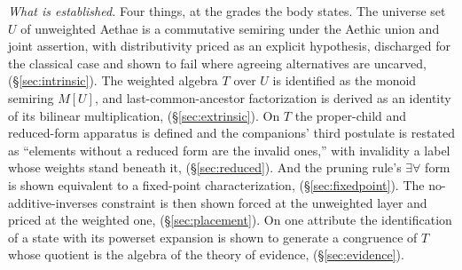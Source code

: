 \emph{What is established.} Four things, at the grades the body states. The universe set $U$ of unweighted Aethae is a commutative semiring under the Aethic union and joint assertion, with distributivity priced as an explicit hypothesis, discharged for the classical case and shown to fail where agreeing alternatives are uncarved, (\S\ref{sec:intrinsic}). The weighted algebra $T$ over $U$ is identified as the monoid semiring $M[U]$, and last-common-ancestor factorization is derived as an identity of its bilinear multiplication, (\S\ref{sec:extrinsic}). On $T$ the proper-child and reduced-form apparatus is defined and the companions' third postulate is restated as ``elements without a reduced form are the invalid ones,'' with invalidity a label whose weights stand beneath it, (\S\ref{sec:reduced}). And the pruning rule's $\exists\forall$ form is shown equivalent to a fixed-point characterization, (\S\ref{sec:fixedpoint}). The no-additive-inverses constraint is then shown forced at the unweighted layer and priced at the weighted one, (\S\ref{sec:placement}). On one attribute the identification of a state with its powerset expansion is shown to generate a congruence of $T$ whose quotient is the algebra of the theory of evidence, (\S\ref{sec:evidence}).
